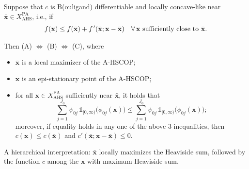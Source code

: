 \documentclass[aspectratio=169,xcolor=dvipsnames]{beamer}
\newcommand{\fp}{f\mkern2mu'}
\begin{document}
\begin{frame}
  \footnotesize
  \setlength{\abovedisplayskip}{4pt}
  \setlength{\belowdisplayskip}{4pt}

  Suppose that $c$ is B(ouligand) differentiable and
  {\color{MediumBlue}locally concave-like} near
  $\bar{\mathbf{x}}\in X_{\mathrm{AHS}}^{\mathrm{PA}}$, i.e., if
  \[
    f(\mathbf{x})\leq f(\bar{\mathbf{x}})+\fp(\bar{\mathbf{x}};
      \mathbf{x}-\bar{\mathbf{x}})\quad
    \forall\,\mathbf{x}\text{ sufficiently close to }\bar{\mathbf{x}}.
  \]

  \vspace{0.02cm}
  Then (A) $\Leftrightarrow$ (B) $\Leftrightarrow$ (C), where
  \begin{itemize}
    \setlength{\itemsep}{0.04cm}
    \item[(A)] $\bar{\mathbf{x}}$ is a local maximizer of the A-HSCOP;
    \item[(B)] $\bar{\mathbf{x}}$ is an epi-stationary point of the A-HSCOP;
    \item[(C)] for all $\mathbf{x}\in X_{\mathrm{AHS}}^{\mathrm{PA}}$
      sufficiently near $\bar{\mathbf{x}}$, it holds that
      \[
        \sum_{j=1}^{J_0}\psi_{0j}\,\mathds{1}_{[0,\infty)}
          \bigl(\phi_{0j}(\mathbf{x})\bigr)\leq
        \sum_{j=1}^{J_0}\psi_{0j}\,\mathds{1}_{[0,\infty)}
          \bigl(\phi_{0j}(\bar{\mathbf{x}})\bigr);
      \]
      moreover, if equality holds in any one of the above 3 inequalities,
      then $c(\mathbf{x})\leq c(\bar{\mathbf{x}})$ and
      $c'(\bar{\mathbf{x}};\mathbf{x}-\bar{\mathbf{x}})\leq 0$.
  \end{itemize}

  \vspace{0.06cm}
  {\color{MediumBlue}A hierarchical interpretation:} $\bar{\mathbf{x}}$
  locally maximizes the Heaviside sum, followed by the function $c$ among the
  $\mathbf{x}$ with maximum Heaviside sum.
\end{frame}
\end{document}
